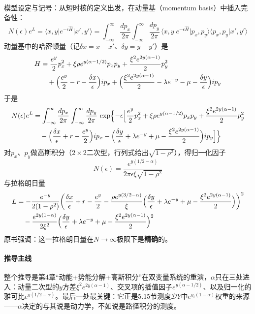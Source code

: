模型设定与记号：从短时核的定义出发，在动量基（momentum basis）中插入完备性：
\begin{equation*}
N(\epsilon)e^{L}=\langle x,y\vert e^{-\epsilon\hat{H}}\vert x',y'\rangle
=\int_{-\infty}^{\infty}\frac{dp_x}{2\pi}\int_{-\infty}^{\infty}\frac{dp_y}{2\pi}\,
\langle x,y\vert e^{-\epsilon\hat{H}}\vert p_x,p_y\rangle
\langle p_x,p_y\vert x',y'\rangle
\end{equation*}
动量基中的哈密顿量（记$\delta x=x-x'$、$\delta y=y-y'$）是
\begin{align*}
H&=\frac{e^{y}}{2}p_x^{2}+\xi\rho e^{y(\alpha-1/2)}p_xp_y
+\frac{\xi^{2}e^{2y(\alpha-1)}}{2}p_y^{2}\\
&\quad+\Bigl(\frac{e^{y}}{2}-r-\frac{\delta x}{\epsilon}\Bigr)ip_x
+\Bigl(\frac{\xi^{2}e^{2y(\alpha-1)}}{2}-\lambda e^{-y}-\mu-\frac{\delta y}{\epsilon}\Bigr)ip_y
\end{align*}
于是
\begin{align*}
N(\epsilon)e^{L}&=\int_{-\infty}^{\infty}\frac{dp_x}{2\pi}\int_{-\infty}^{\infty}\frac{dp_y}{2\pi}\,
\exp\Bigl\{-\epsilon\Bigl[\frac{e^{y}}{2}p_x^{2}
+\xi\rho e^{y(\alpha-1/2)}p_xp_y+\frac{\xi^{2}e^{2y(\alpha-1)}}{2}p_y^{2}\\
&\quad-\Bigl(\frac{\delta x}{\epsilon}+r-\frac{e^{y}}{2}\Bigr)ip_x
-\Bigl(\frac{\delta y}{\epsilon}+\lambda e^{-y}+\mu-\frac{\xi^{2}e^{2y(\alpha-1)}}{2}\Bigr)ip_y\Bigr]\Bigr\}
\end{align*}
对$p_x$、$p_y$做高斯积分（$2\times2$二次型，行列式给出$\sqrt{1-\rho^{2}}$），得归一化因子
\begin{equation*}
N(\epsilon)=\frac{e^{y(1/2-\alpha)}}{2\pi\epsilon\xi\sqrt{1-\rho^{2}}}
\end{equation*}
与拉格朗日量
\begin{align*}
L&=-\frac{e^{-y}}{2(1-\rho^{2})}\biggl(\frac{\delta x}{\epsilon}+r-\frac{e^{y}}{2}
-\frac{\rho e^{y(3/2-\alpha)}}{\xi}
\Bigl(\frac{\delta y}{\epsilon}+\lambda e^{-y}+\mu-\frac{\xi^{2}e^{2y(\alpha-1)}}{2}\Bigr)\biggr)^{2}\\
&\quad-\frac{e^{2y(1-\alpha)}}{2\xi^{2}}
\Bigl(\frac{\delta y}{\epsilon}+\lambda e^{-y}+\mu-\frac{\xi^{2}e^{2y(\alpha-1)}}{2}\Bigr)^{2}
\end{align*}
原书强调：这一拉格朗日量在$N\to\infty$极限下是\textbf{精确}的。

\paragraph{推导主线}
整个推导是第4章“动能+势能分解+高斯积分”在双变量系统的重演，$\alpha$只在三处进入：动量二次型的$y$方差$\xi^{2}e^{2y(\alpha-1)}$、交叉项的插值因子$e^{y(\alpha-1/2)}$、以及归一化的雅可比$e^{y(1/2-\alpha)}$。最后一处最关键：它正是5.15节测度$\mathcal{D}Y$中$e^{y_i(1-\alpha)}$权重的来源——$\alpha$决定的与其说是动力学，不如说是路径积分的测度。

